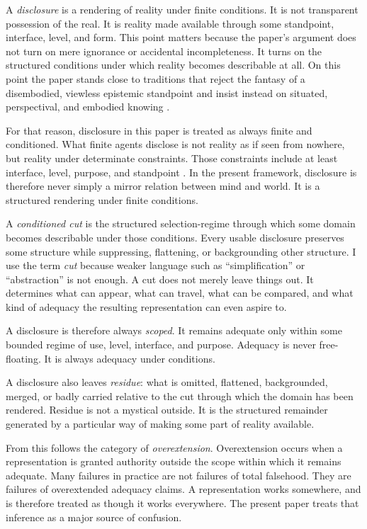 \documentclass[11pt]{article}
\renewcommand{\emph}[1]{\textit{#1}}
\begin{document}
A \emph{disclosure} is a rendering of reality under finite conditions. It is not transparent possession of the real. It is reality made available through some standpoint, interface, level, and form. This point matters because the paper's argument does not turn on mere ignorance or accidental incompleteness. It turns on the structured conditions under which reality becomes describable at all. On this point the paper stands close to traditions that reject the fantasy of a disembodied, viewless epistemic standpoint and insist instead on situated, perspectival, and embodied knowing \cite{Haraway1988,Polanyi1958,Nagel1986}.

For that reason, disclosure in this paper is treated as always finite and conditioned. What finite agents disclose is not reality as if seen from nowhere, but reality under determinate constraints. Those constraints include at least interface, level, purpose, and standpoint \cite{Haraway1988,Nagel1986}. In the present framework, disclosure is therefore never simply a mirror relation between mind and world. It is a structured rendering under finite conditions.

A \emph{conditioned cut} is the structured selection-regime through which some domain becomes describable under those conditions. Every usable disclosure preserves some structure while suppressing, flattening, or backgrounding other structure. I use the term \emph{cut} because weaker language such as ``simplification'' or ``abstraction'' is not enough. A cut does not merely leave things out. It determines what can appear, what can travel, what can be compared, and what kind of adequacy the resulting representation can even aspire to.

A disclosure is therefore always \emph{scoped}. It remains adequate only within some bounded regime of use, level, interface, and purpose. Adequacy is never free-floating. It is always adequacy under conditions.

A disclosure also leaves \emph{residue}: what is omitted, flattened, backgrounded, merged, or badly carried relative to the cut through which the domain has been rendered. Residue is not a mystical outside. It is the structured remainder generated by a particular way of making some part of reality available.

From this follows the category of \emph{overextension}. Overextension occurs when a representation is granted authority outside the scope within which it remains adequate. Many failures in practice are not failures of total falsehood. They are failures of overextended adequacy claims. A representation works somewhere, and is therefore treated as though it works everywhere. The present paper treats that inference as a major source of confusion.
\end{document}
